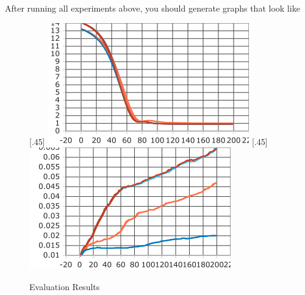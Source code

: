 After running all experiments above, you should generate graphs that look like

\begin{figure}[ht]
    [.45\linewidth]{%
        \includegraphics[width=\linewidth]{./figures/eval_MSE}%
    }%
    \hfill
    [.45\linewidth]{%
        \includegraphics[width=\linewidth]{./figures/eval_Mean_Reciprocal_Rank}%
    }
    \caption{Evaluation Results}
\end{figure}

